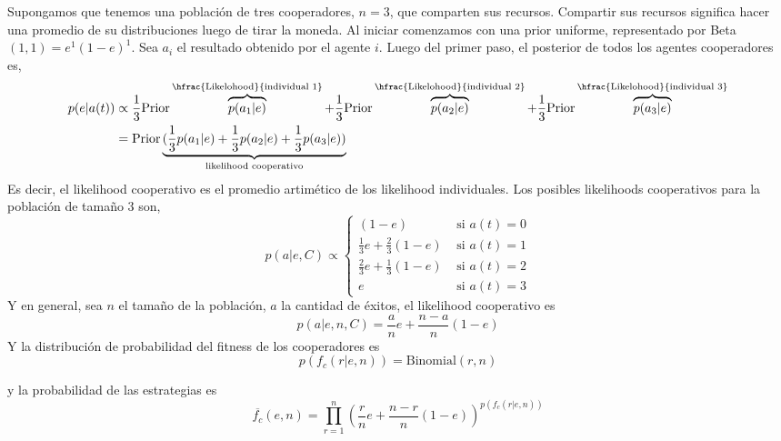 \documentclass[a4paper,10pt]{article}
\begin{document}
Supongamos que tenemos una población de tres cooperadores, $n=3$, que comparten sus recursos.
Compartir sus recursos significa hacer una promedio de su distribuciones luego de tirar la moneda.
Al iniciar comenzamos con una prior uniforme, representado por Beta$(1,1)=e^1 (1-e)^1$.
Sea $a_i$ el resultado obtenido por el agente $i$.
Luego del primer paso, el posterior de todos los agentes cooperadores es,
\begin{equation}
\begin{split}
p(e|a(t)) &\propto \frac{1}{3} \text{Prior}  \overbrace{p(a_1|e)}^{\hfrac{\text{Likelohood}}{\text{individual 1}}} + \frac{1}{3} \text{Prior}  \overbrace{p(a_2|e)}^{\hfrac{\text{Likelohood}}{\text{individual 2}}}  + \frac{1}{3} \text{Prior}  \overbrace{p(a_3|e)}^{\hfrac{\text{Likelohood}}{\text{individual 3}}}  \\
&= \text{Prior} \underbrace{(\frac{1}{3} p(a_1|e) + \frac{1}{3} p(a_2|e) + \frac{1}{3} p(a_3|e))}_{\text{likelihood cooperativo}}
\end{split}
\end{equation}
%
Es decir, el likelihood cooperativo es el promedio artimético de los likelihood individuales.
Los posibles likelihoods cooperativos para la población de tamaño 3 son,
%
\begin{equation}
p(a|e,C) \propto 
\begin{cases}
(1-e) & \text{ si } a(t) = 0 \\
\frac{1}{3} e + \frac{2}{3} (1-e)  & \text{ si } a(t) = 1 \\
\frac{2}{3} e + \frac{1}{3} (1-e)    & \text{ si } a(t) = 2 \\
e & \text{ si } a(t) = 3
\end{cases}
\end{equation}
%
Y en general, sea $n$ el tamaño de la población, $a$ la cantidad de éxitos, el likelihood cooperativo es
\begin{equation}
p(a|e,n,C) = \frac{a}{n} e + \frac{n-a}{n}(1-e)
\end{equation}
%
Y la distribución de probabilidad del fitness de los cooperadores es
\begin{equation}
p(f_c(r|e,n)) = \text{Binomial}(r,n)
\end{equation}

y la probabilidad de las estrategias es
\begin{equation}
\overline{f_c}(e,n) = \prod_{r=1}^n \left( \frac{r}{n} e + \frac{n-r}{n}(1-e) \right)^{p(f_c(r|e,n))}
\end{equation}
\end{document}

